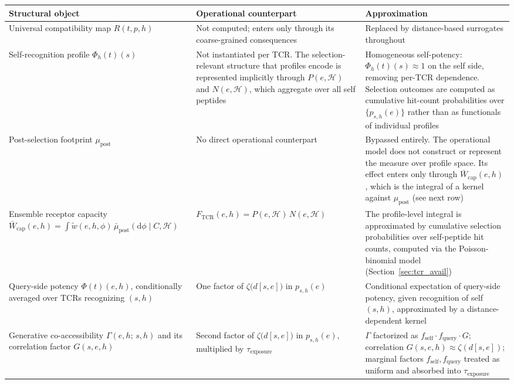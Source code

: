 \documentclass[11pt]{article}
\begin{document}
\begin{table}[H]
\centering
\small
\renewcommand{\arraystretch}{1.35}
\begin{tabular}{p{4.2cm} p{4.8cm} p{5.5cm}}
\hline
\textbf{Structural object} & \textbf{Operational counterpart} & \textbf{Approximation} \\
\hline
Universal compatibility map \(R(t,p,h)\) &
Not computed; enters only through its coarse-grained consequences &
Replaced by distance-based surrogates throughout \\[4pt]

Self-recognition profile \(\Phi_h(t)(s)\) &
Not instantiated per TCR. The selection-relevant structure that profiles encode is represented implicitly through \(P(e,\mathcal{H})\) and \(N(e,\mathcal{H})\), which aggregate over all self peptides &
Homogeneous self-potency: \(\Phi_h(t)(s)\approx 1\) on the self side, removing per-TCR dependence. Selection outcomes are computed as cumulative hit-count probabilities over \(\{p_{s,h}(e)\}\) rather than as functionals of individual profiles \\[4pt]

Post-selection footprint \(\mu_{\mathrm{post}}\) &
No direct operational counterpart &
Bypassed entirely. The operational model does not construct or represent the measure over profile space. Its effect enters only through \(\bar{W}_{\mathrm{cap}}(e,h)\), which is the integral of a kernel against \(\mu_{\mathrm{post}}\) (see next row) \\[4pt]

Ensemble receptor capacity \(\bar{W}_{\mathrm{cap}}(e,h) = \int \widetilde{w}(e,h,\phi)\,\bar{\mu}_{\mathrm{post}}(\mathrm{d}\phi \mid C,\mathcal{H})\) &
\(F_{\mathrm{TCR}}(e,h) = P(e,\mathcal{H})\,N(e,\mathcal{H})\) &
The profile-level integral is approximated by cumulative selection probabilities over self-peptide hit counts, computed via the Poisson-binomial model (Section~\ref{sec:tcr_avail}) \\[4pt]

Query-side potency \(\Phi(t)(e,h)\), conditionally averaged over TCRs recognizing \((s,h)\) &
One factor of \(\zeta\bigl(d[s,e]\bigr)\) in \(p_{s,h}(e)\) &
Conditional expectation of query-side potency, given recognition of self \((s,h)\), approximated by a distance-dependent kernel \\[4pt]

Generative co-accessibility \(\Gamma(e,h;\,s,h)\) and its correlation factor \(G(s,e,h)\) &
Second factor of \(\zeta\bigl(d[s,e]\bigr)\) in \(p_{s,h}(e)\), multiplied by \(\tau_{\mathrm{exposure}}\) &
\(\Gamma\) factorized as \(f_{\mathrm{self}}\cdot f_{\mathrm{query}} \cdot G\); correlation \(G(s,e,h)\approx\zeta(d[s,e])\); marginal factors \(f_{\mathrm{self}},f_{\mathrm{query}}\) treated as uniform and absorbed into \(\tau_{\mathrm{exposure}}\) \\[4pt]


\end{tabular}
\end{table}
\end{document}

